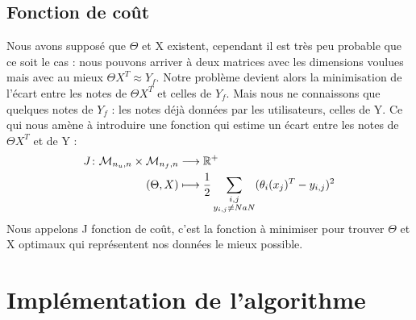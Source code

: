 \documentclass[a4paper,10pt]{article}
\begin{document}
\subsection{Fonction de coût}

Nous avons supposé que $\Theta$ et X existent, cependant il est très peu probable que ce soit le cas : nous pouvons arriver à deux matrices avec les dimensions voulues mais avec au mieux $\Theta X^T \approx Y_f$. Notre problème devient alors la minimisation de l'écart entre les notes de $\Theta X^T$ et celles de $Y_f$. Mais nous ne connaissons que quelques notes de $Y_f$ : les notes déjà données par les utilisateurs, celles de Y. Ce qui nous amène à introduire une fonction qui estime un écart entre les notes de $\Theta X^T$ et de Y :
\begin{align*}
J\colon{\cal M}_{n_u, n} \times {\cal M}_{n_f, n} &\longrightarrow \mathbb{R}^+\\
(\Theta, X)&\longmapsto \frac{1}{2}\sum_{\substack{i,j \\ y_{i,j} \ne NaN}}(\theta_{i}(x_{j})^{T}-y_{i,j})^{2}
\end{align*}
Nous appelons J fonction de coût, c'est la fonction à minimiser pour trouver $\Theta$ et X optimaux qui représentent nos données le mieux possible.

\section{Implémentation de l'algorithme}
\end{document}
